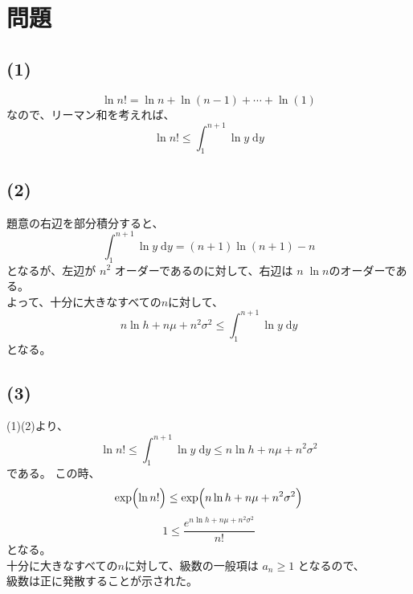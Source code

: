 \documentclass[a4j,10pt,oneside,openany]{jsbook}
\newcommand{\diff}{\mathrm{d}}  %
\begin{document}
\section*{問題 }
\subsection*{(1)}
\[ \ln n! = \ln n + \ln (n-1) + \cdots +\ln (1) \]
なので、リーマン和を考えれば、
\[ \ln n! \leq \int^{n+1}_{1} \ln y \; \diff y \]
\subsection*{(2)}
題意の右辺を部分積分すると、
\[ \int^{n+1}_{1} \ln y \; \diff y = (n+1) \ln (n+1) - n \]
となるが、左辺が $n^2$ オーダーであるのに対して、右辺は $n \; \ln n$のオーダーである。\\
よって、十分に大きなすべての$n$に対して、
\[ n \ln h + n \mu + n^2 \sigma ^2 \leq \int^{n+1}_{1} \ln y \; \diff y \]
となる。
\subsection*{(3)}
(1)(2)より、
\[ \ln n! \leq \int^{n+1}_{1} \ln y \; \diff y \leq n \ln h + n \mu + n^2 \sigma ^2 \]
である。
この時、
\[ \exp \Bigl{(} \ln n! \Bigr{)} \leq \exp \Bigl{(} n \ln h + n \mu + n^2 \sigma ^2 \Bigr{)} \]
\[ 1 \leq \frac{e^{n \ln h + n \mu + n^2 \sigma ^2}}{n!} \]
となる。\\
十分に大きなすべての$n$に対して、級数の一般項は $a_n \geq 1$ となるので、\\
級数は正に発散することが示された。
%
%
\end{document}
